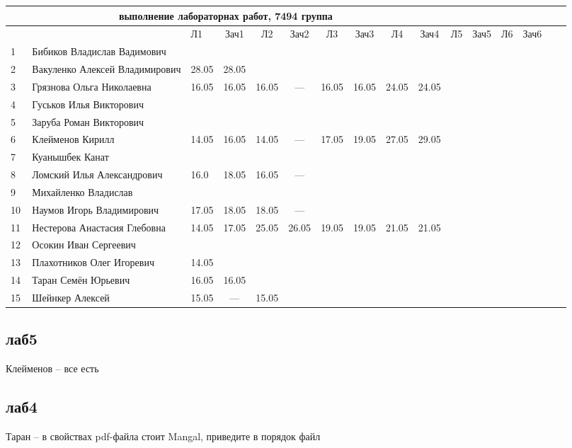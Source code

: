 \documentclass[a4paper,11pt]{article}
\begin{document}
\newpage
{}
\recalctypearea

%
\hspace{-6.1cm} %
\begin{tabular}{l|llccccccccccccc}
\multicolumn{10}{c}{выполнение лабораторнах работ, 7494 группа} \\
\toprule
&&Л1&Зач1& Л2&Зач2& Л3&Зач3& Л4&Зач4& Л5&Зач5& Л6&Зач6&\\ 
\midrule
1\,&Бибиков Владислав Вадимович    &&&&&&&&\\
2\,&Вакуленко Алексей Владимирович &28.05&28.05&&&&&&\\
3\,&Грязнова Ольга Николаевна      &16.05&16.05&16.05& --- &16.05&16.05&24.05&24.05\\
4\,&Гуськов Илья Викторович        &&&&&&&&\\
5\,&Заруба Роман Викторович        &&&&&&&&\\
\midrule
6\,&Клейменов Кирилл               &14.05&16.05&14.05& --- &17.05&19.05&27.05&29.05\\
7\,&Куанышбек Канат                &&&&&&&&\\
8\,&Ломский Илья Александрович     &16.0&18.05&16.05& --- &&&&\\
9\,&Михайленко Владислав           &&&&&&&&\\
10\,&Наумов Игорь Владимирович     &17.05&18.05&18.05& --- &&&&\\
\midrule
11\,&Нестерова Анастасия Глебовна  &14.05&17.05&25.05&26.05&19.05&19.05&21.05&21.05\\
12\,&Осокин Иван Сергеевич         &&&&&&&&\\
13\,&Плахотников Олег Игоревич     &14.05&&&&&&&\\
14\,&Таран Семён Юрьевич           &16.05&16.05&&&&&&\\
15\,&Шейнкер Алексей               &15.05& --- &15.05&&&&&\\

\bottomrule
\end{tabular}

\newpage
{}
\recalctypearea
\subsection*{лаб5}
Клейменов -- все есть

\subsection*{лаб4}
Таран -- в свойствах pdf-файла стоит Mangal, приведите в порядок файл
\end{document}
